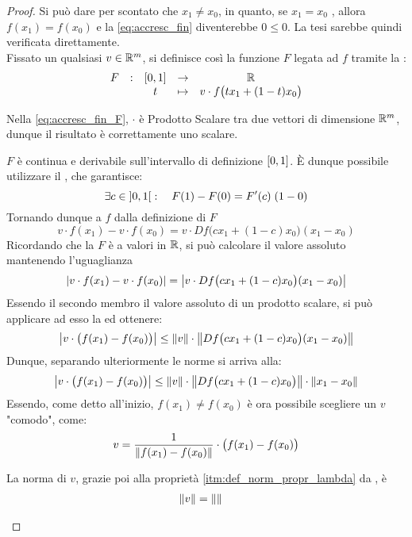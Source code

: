 \begin{theorem}
\begin{note}
	\end{note}
	\begin{proof}
		Si può dare per scontato che $x_1 \neq x_0$, in quanto, se $x_1 = x_0$ , allora $f(x_1) = f(x_0)$ e la \cref{eq:accresc_fin} diventerebbe $0 \leq 0$. La tesi sarebbe quindi verificata direttamente.\\
		Fissato un qualsiasi $v \in \mathbb{R}^m$, si definisce così la funzione $F$ legata ad $f$ tramite la :
		\begin{equation}
			\label{eq:accresc_fin_F}
			\begin{array}{ccccc} {F} & : & {\left[0,1\right]} & \to & {\mathbb{R}} \\ & & {t} & \mapsto & {v \cdot f \bigl( t x_1 + (1-t)x_0 \bigr)} \\ \end{array}
		\end{equation}
		\begin{note}
			Nella \cref{eq:accresc_fin_F},  $\cdot$  è Prodotto Scalare tra due vettori di dimensione $\mathbb{R}^m$, dunque il risultato è correttamente uno scalare.
		\end{note}
		$F$ è continua e derivabile sull'intervallo di definizione $\left[0,1\right]$. È dunque possibile utilizzare il , che garantisce:
		\[\exists c \in \left]0,1\right[: \quad F(1) - F(0) = F'(c) \; (1-0)\]
		Tornando dunque a $f$ dalla definizione di $F$
		\[v \cdot f(x_1) - v \cdot f(x_0) = v \cdot Df\bigl( cx_1 + (1-c)x_0 \bigr) (x_1 - x_0)\]
		Ricordando che la $F$ è a valori in $\mathbb{R}$, si può calcolare il valore assoluto mantenendo l'uguaglianza
		\[\left|v \cdot f(x_1) - v \cdot f(x_0)\right| = \left|v \cdot Df\bigl( cx_1 + (1-c)x_0 \bigr) (x_1 - x_0)\right|\]
		Essendo il secondo membro il valore assoluto di un prodotto scalare, si può applicare ad esso la  ed ottenere: 
		\[\left|v \cdot \bigl( f(x_1) - f(x_0) \bigr)\right| \leq \left\|v\right\| \cdot \left\|Df\bigl( cx_1 + (1-c)x_0 \bigr) (x_1 - x_0)\right\|\]
		Dunque, separando ulteriormente le norme si arriva alla:
		\begin{equation}
			\label{eq:accr_fin_norm}
			\left|v \cdot \bigl( f(x_1) - f(x_0) \bigr)\right| \leq \left\|v\right\| \cdot \left\|Df\bigl( cx_1 + (1-c)x_0 \bigr)\right\| \cdot \left\|x_1 - x_0\right\|
		\end{equation}
		Essendo, come detto all'inizio, $f(x_1) \neq f(x_0)$ è ora possibile scegliere un $v$ "comodo", come:
		\[v = \frac{1}{\left\|f(x_1) - f(x_0)\right\|} \cdot \bigl( f(x_1) - f(x_0) \bigr)\]
		\begin{note}
			La norma di $v$, grazie poi alla proprietà \ref{itm:def_norm_propr_lambda} da , è
			\begin{align*}
				\left\|v\right\| &= \left\|
\right\|
\end{align*}
\end{note}
\end{proof}
\end{theorem}
